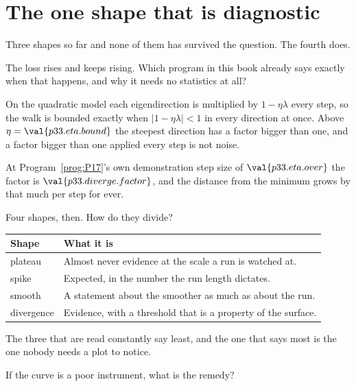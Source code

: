\section{The one shape that is diagnostic}
\label{sec:P33-diverge}

\begin{fr}
Three shapes so far and none of them has survived the question. The fourth
does.

The loss rises and keeps rising. Which program in this book already says
exactly when that happens, and why it needs no statistics at all?
\dotline
\nextframe
\end{fr}

\begin{fr}
\begin{ansblock}
On the quadratic model each eigendirection is multiplied by
$1 - \eta\lambda$ every step, so the walk is bounded exactly when
$\lvert 1 - \eta\lambda \rvert < 1$ in every direction at once. Above
$\eta = \val{p33.eta.bound}$ the steepest direction has a factor bigger than
one, and a factor bigger than one applied every step is not noise.
\end{ansblock}

At Program~\ref{prog:P17}'s own demonstration step size of
$\val{p33.eta.over}$ the factor is $\val{p33.diverge.factor}$, and the
distance from the minimum grows by that much per step for ever.

Four shapes, then. How do they divide?
\dotline
\nextframe
\end{fr}

\begin{fr}

\begin{center}
\begin{tabularx}{\linewidth}{@{}lX@{}}
\toprule
\textbf{Shape} & \textbf{What it is} \\
\midrule
plateau & Almost never evidence at the scale a run is watched at. \\
spike & Expected, in the number the run length dictates. \\
smooth & A statement about the smoother as much as about the run. \\
divergence & Evidence, with a threshold that is a property of the surface. \\
\bottomrule
\end{tabularx}
\end{center}

The three that are read constantly say least, and the one that says most is
the one nobody needs a plot to notice.

If the curve is a poor instrument, what is the remedy?
\dotline
\nextframe
\end{fr}

